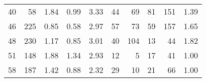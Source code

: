 \begin{tabular}{rrrrrrrrrr}
40 &       58 &                             1.84 &                             0.99 &                             3.33 &              44 &              69 &                                 81 &                             151 &       1.39 \\
46 &      225 &                             0.85 &                             0.58 &                             2.97 &              57 &              73 &                                 59 &                             157 &       1.65 \\
48 &      230 &                             1.17 &                             0.85 &                             3.01 &              40 &             104 &                                 13 &                              44 &       1.82 \\
51 &      148 &                             1.88 &                             1.34 &                             2.93 &              12 &               5 &                                 17 &                              41 &       1.00 \\
58 &      187 &                             1.42 &                             0.88 &                             2.32 &              29 &              10 &                                 21 &                              66 &       1.00 \\
\bottomrule
\end{tabular}
